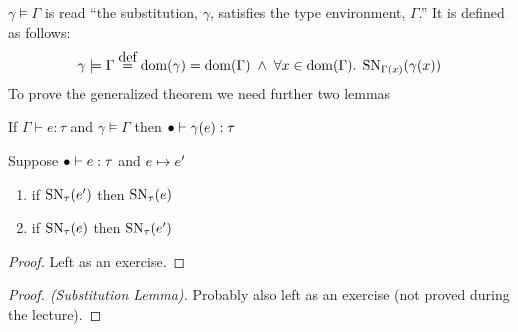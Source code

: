 $\gamma \models \Gamma$ is read ``the substitution, $\gamma$, satisfies the type environment, $\Gamma$.'' It is defined as follows:
\[
  \gamma \models \Gamma \eqdef \dom(\gamma) = \dom(\Gamma) \; \wedge \; 
                 \forall x \in \dom(\Gamma). \; \SN{\Gamma(x)}{\gamma(x)}
\]
To prove the generalized theorem we need further two lemmas
\begin{substlem}
  If $\Gamma \vdash e : \tau$ and $\gamma \models \Gamma$ then $\bullet \vdash \gamma (e) : \tau$
\end{substlem}
\begin{forback}
  Suppose $\bullet \vdash e : \tau$ and $e \mapsto e'$
  \begin{enumerate}
  \item if $\operatorname{SN}_{\tau}(e')$ then $\operatorname{SN}_{\tau}(e)$
  \item if $\operatorname{SN}_{\tau}(e)$ then $\operatorname{SN}_{\tau}(e')$
  \end{enumerate}
\end{forback}
\begin{proof}
  Left as an exercise.
\end{proof}
\begin{proof}[Proof. (Substitution Lemma)] 
  Probably also left as an exercise (not proved during the lecture).
\end{proof}
